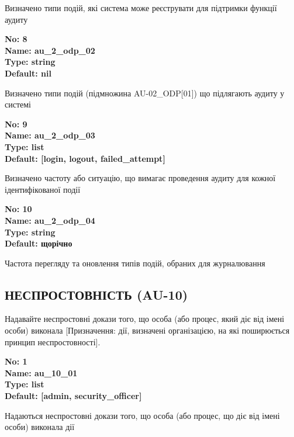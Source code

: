 \documentclass{article}
\begin{document}
{\footnotesize Визначено типи подій, які система може реєструвати для підтримки функції аудиту}


{\footnotesize\bfseries
No: 8\\
Name: au\_\allowbreak{}2\_\allowbreak{}odp\_\allowbreak{}02\\
Type: string\\
Default: nil
}

{\footnotesize Визначено типи подій (підмножина AU-02\_\allowbreak{}ODP[01]) що підлягають аудиту у системі}


{\footnotesize\bfseries
No: 9\\
Name: au\_\allowbreak{}2\_\allowbreak{}odp\_\allowbreak{}03\\
Type: list\\
Default: [\textquotedbl{}login\textquotedbl{}, \textquotedbl{}logout\textquotedbl{}, \textquotedbl{}failed\_\allowbreak{}attempt\textquotedbl{}]
}

{\footnotesize Визначено частоту або ситуацію, що вимагає проведення аудиту для кожної ідентифікованої події}


{\footnotesize\bfseries
No: 10\\
Name: au\_\allowbreak{}2\_\allowbreak{}odp\_\allowbreak{}04\\
Type: string\\
Default: \textquotedbl{}щорічно\textquotedbl{}
}

{\footnotesize Частота перегляду та оновлення типів подій, обраних для журналювання}




\subsection{НЕСПРОСТОВНІСТЬ (AU-10)}
Надавайте неспростовні докази того, що особа (або процес, який діє від імені особи) виконала [Призначення: дії, визначені організацією, на які поширюється принцип неспростовності].

\vspace{10pt}
{\footnotesize\bfseries
No: 1\\
Name: au\_\allowbreak{}10\_\allowbreak{}01\\
Type: list\\
Default: [\textquotedbl{}admin\textquotedbl{}, \textquotedbl{}security\_\allowbreak{}officer\textquotedbl{}]
}

{\footnotesize Надаються неспростовні докази того, що особа (або процес, що діє від імені особи) виконала дії}
\end{document}
